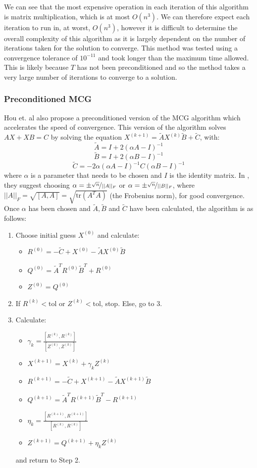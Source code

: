 \documentclass[11pt]{article}
\numberwithin{equation}{section}
\begin{document}
We can see that the most expensive operation in each iteration of this algorithm is matrix multiplication, which is at most $O(n^3)$. We can therefore expect each iteration to run in, at worst, $O(n^3)$, however it is difficult to determine the overall complexity of this algorithm as it is largely dependent on the number of iterations taken for the solution to converge. This method was tested using a convergence tolerance of $10^{-11}$ and took longer than the maximum time allowed. This is likely because $T$ has not been preconditioned and so the method takes a very large number of iterations to converge to a solution.

\subsubsection{Preconditioned MCG}
Hou et. al \cite{Hou} also propose a preconditioned version of the MCG algorithm which accelerates the speed of convergence. This version of the algorithm solves $AX + XB = C$ by solving the equation 
$X^{(k+1)} = \widetilde{A}X^{(k)} \widetilde{B} + \widetilde{C}$, with:
\[ \widetilde{A} = I + 2(\alpha A - I)^{-1} \]
\[ \widetilde{B} = I + 2(\alpha B - I)^{-1} \]
\[ \widetilde{C} = -2\alpha(\alpha A - I)^{-1} C (\alpha B - I)^{-1} \]
where $\alpha$ is a parameter that needs to be chosen and $I$ is the identity matrix. In \cite{Hou}, they suggest choosing $\alpha = \pm \nicefrac{\sqrt{n}}{||A||_F}$ or $\alpha = \pm \nicefrac{\sqrt{n}}{||B||_F}$, where $||A||_F = \sqrt{[A,A]} = \sqrt{\text{tr}(A^TA)}$ (the Frobenius norm), for good convergence. Once $\alpha$ has been chosen and $\widetilde{A}, \widetilde{B}$ and $\widetilde{C}$ have been calculated, the algorithm is as follows:
\begin{enumerate}
\item Choose initial guess $X^{(0)}$ and calculate:
	\begin{itemize}
	\item $R^{(0)} = -\widetilde{C} + X^{(0)} - \widetilde{A}X^{(0)} \widetilde{B}$
	\item $Q^{(0)} = \widetilde{A}^T R^{(0)}\widetilde{B}^T + R^{(0)}$
	\item $Z^{(0)} = Q^{(0)}$
	\end{itemize}
\item If $R^{(k)} < \text{tol}$ or $Z^{(k)} < \text{tol}$, stop. Else, go to 3.
\item Calculate:
	\begin{itemize}
	\item $ \gamma_k = \frac{[R^{(k)}, R^{(k)}]}{[Z^{(k)}, Z^{(k)}]}$
	\item $X^{(k+1)} = X^{(k)} + \gamma_k Z^{(k)} $
	\item $R^{(k+1)} = -\widetilde{C} + X^{(k+1)} - \widetilde{A}X^{(k+1)} \widetilde{B}$
	\item $Q^{(k+1)} = \widetilde{A}^T R^{(k+1)}\widetilde{B}^T - R^{(k+1)}$
	\item $\eta_k = \frac{[R^{(k+1)}, R^{(k+1)}]}{[R^{(k)}, R^{(k)}]}$ 
	\item $Z^{(k+1)} = Q^{(k+1)} + \eta_k Z^{(k)}$
	\end{itemize}
	and return to Step 2.
\end{enumerate}
\end{document}
